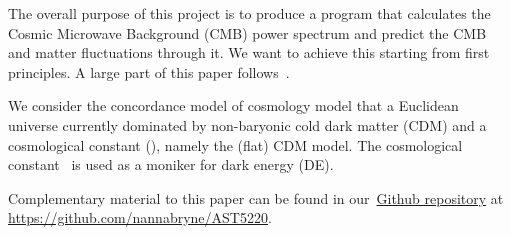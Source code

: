 






The overall purpose of this project is to produce a program that calculates the Cosmic Microwave Background (CMB) power spectrum and predict the CMB and matter fluctuations through it. We want to achieve this starting from first principles. A large part of this paper follows~\citet{Callin2006}.

We consider the concordance model of cosmology model that a Euclidean universe currently dominated by non-baryonic cold dark matter (CDM) and a cosmological constant (\textLambda), namely the (flat) \textLambda CDM model. The cosmological constant \textLambda\, is used as a moniker for dark energy (DE).~\citep{DodelsonBook}

Complementary material to this paper can be found in our~\href{https://github.com/nannabryne/AST5220}{Github repository} at \url{https://github.com/nannabryne/AST5220}.